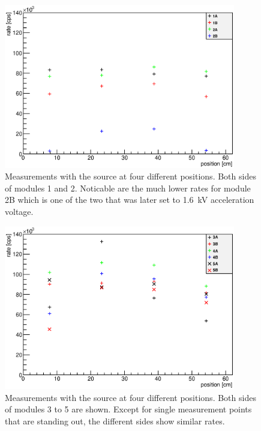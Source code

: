   
  \begin{figure}
		\centering
		\includegraphics[width = 0.9\textwidth]{graphics/analysis/12final.eps}
  	\caption[Testing of muon modules with Sr source - Modules 1 \& 2]{Measurements with the source at four different positions. Both sides of modules 1 and 2. Noticable are the much lower rates for module 2B which is one of the two that was later set to \SI{1.6}{\kilo\volt} acceleration voltage. }
  	\label{fig:SrRatesPMT12}
  \end{figure}
    \begin{figure}
		\centering
		\includegraphics[width = 0.9\textwidth]{graphics/analysis/345final.eps}
  	\caption[Testing of muon modules with Sr source - Modules 3 - 5]{Measurements with the source at four different positions. Both sides of modules 3 to 5 are shown. Except for single measurement points that are standing out, the different sides show similar rates. }
  	\label{fig:SrRatesPMT345}
  \end{figure}
